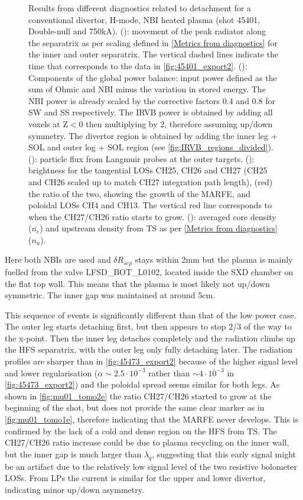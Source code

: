 \begin{figure}
     \caption{Results from different diagnostics related to detachment for a conventional divertor, H-mode, NBI heated plasma (shot 45401, Double-null and 750kA). (): movement of the peak radiator along the separatrix as per scaling defined in \autoref{Metrics from diagnostics} for the inner and outer separatrix. The vertical dashed lines indicate the time that corresponds to the data in \autoref{fig:45401_export2}. (): Components of the global power balance: input power defined as the sum of Ohmic and NBI minus the variation in stored energy. The NBI power is already scaled by the corrective factors 0.4 and 0.8 for SW and SS respectively. The IRVB power is obtained by adding all voxels at Z$<$0 then multiplying by 2, therefore assuming up/down symmetry. The divertor region is obtained by adding the inner leg + SOL and outer log + SOL region (see \autoref{fig:IRVB_regions_divided}). (): particle flux from Langmuir probes at the outer targets. (): brightness for the tangential LOSs CH25, CH26 and CH27 (CH25 and CH26 scaled up to match CH27 integration path length), (red) the ratio of the two, showing the growth of the MARFE, and poloidal LOSs CH4 and CH13. The vertical red line corresponds to when the CH27/CH26 ratio starts to grow. (): averaged core density ($\overline{n_e}$) and upstream density from TS as per \autoref{Metrics from diagnostics} ($n_u$).}
	\label{fig:mu01_tomo2}
\end{figure}
Here both NBIs are used and $\delta R_{sep}$ stays within 2mm but the plasma is mainly fuelled from the valve LFSD\_BOT\_L0102, located inside the SXD chamber on the flat top wall. This means that the plasma is most likely not up/down symmetric. The inner gap was maintained at around 5cm.

This sequence of events is significantly different than that of the low power case. The outer leg starts detaching first, but then appears to stop 2/3 of the way to the x-point. Then the inner leg detaches completely and the radiation climbs up the HFS separatrix, with the outer leg only fully detaching later. The radiation profiles are sharper than in \autoref{fig:45473_export2} because of the higher signal level and lower regularisation ($\alpha \sim 2.5 \cdot 10^{-3}$ rather than $\sim 4 \cdot 10^{-3}$ in \autoref{fig:45473_export2}) and the poloidal spread seems similar for both legs. As shown in \autoref{fig:mu01_tomo2e} the ratio CH27/CH26 started to grow at the beginning of the shot, but does not provide the same clear marker as in \autoref{fig:mu01_tomo1e}, therefore indicating that the MARFE never develops. This is confirmed by the lack of a cold and dense region on the HFS from TS. The CH27/CH26 ratio increase could be due to plasma recycling on the inner wall, but the inner gap is much larger than $\lambda_q$, suggesting that this early signal might be an artifact due to the relatively low signal level of the two resistive bolometer LOSs. From LPs the current is similar for the upper and lower divertor, indicating minor up/down asymmetry.


